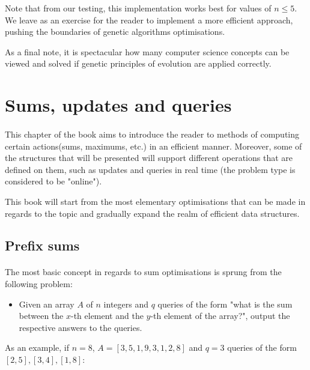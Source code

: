 \documentclass[letterpaper]{article}
\begin{document}
Note that from our testing, this implementation works best for values of $n \leq 5$. We leave as an exercise for the reader to implement a more efficient approach, pushing the boundaries of genetic algorithms optimisations.

As a final note, it is spectacular how many computer science concepts can be viewed and solved if genetic principles of evolution are applied correctly.

\newpage

\section{Sums, updates and queries}

\paragraph{}

This chapter of the book aims to introduce the reader to methods of computing certain actions(sums, maximums, etc.) in an efficient manner. Moreover, some of the structures that will be presented will support different operations that are defined on them, such as updates and queries in real time (the problem type is considered to be "online").

This book will start from the most elementary optimisations that can be made in regards to the topic and gradually expand the realm of efficient data structures.

\subsection{Prefix sums}

\paragraph{}

The most basic concept in regards to sum optimisations is sprung from the following problem:

\begin{itemize}
    \item Given an array $A$ of $n$ integers and $q$ queries of the form "what is the sum between the $x$-th element and the $y$-th element of the array?", output the respective answers to the queries. 
\end{itemize}

As an example, if $n = 8$, $A = [3, 5, 1, 9, 3, 1, 2, 8]$ and $q = 3$ queries of the form $[2, 5], [3, 4], [1, 8]$:
\end{document}

